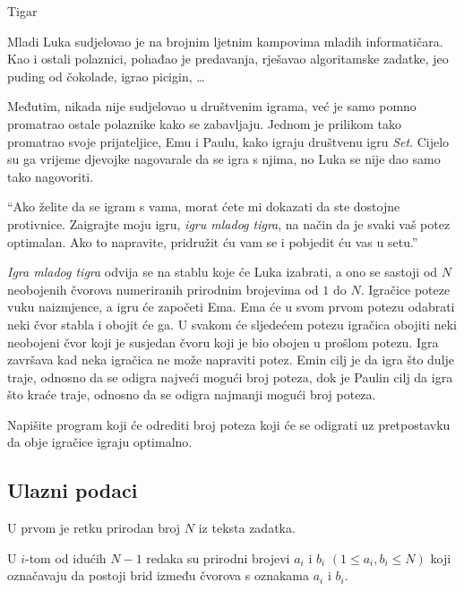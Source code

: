 \begin{statement}[
  problempoints=100,
  timelimit=3 sekunde,
  memorylimit=512 MiB,
]{Tigar}

Mladi Luka sudjelovao je na brojnim ljetnim kampovima mladih informatičara.
Kao i ostali polaznici, pohađao je predavanja, rješavao algoritamske zadatke,
jeo puding od čokolade, igrao picigin, \ldots

Međutim, nikada nije sudjelovao u društvenim igrama, već je samo pomno
promatrao ostale polaznike kako se zabavljaju. Jednom je prilikom tako
promatrao svoje prijateljice, Emu i Paulu, kako igraju društvenu igru
\textit{Set}. Cijelo su ga vrijeme djevojke nagovarale da se igra s njima,
no Luka se nije dao samo tako nagovoriti.

``Ako želite da se igram s vama, morat ćete mi dokazati da ste dostojne
  protivnice. Zaigrajte moju igru, \textit{igru mladog tigra}, na način da je
  svaki vaš potez optimalan. Ako to napravite, pridružit ću vam se i pobjedit ću
  vas u setu.''

\textit{Igra mladog tigra} odvija se na stablu koje će Luka izabrati, a ono se
sastoji od $N$ neobojenih čvorova numeriranih prirodnim brojevima od $1$ do
$N$. Igračice poteze vuku naizmjence, a igru će započeti Ema. Ema će u svom
prvom potezu odabrati neki čvor stabla i obojit će ga. U svakom će sljedećem
potezu igračica obojiti neki neobojeni čvor koji je susjedan čvoru koji je
bio obojen u prošlom potezu. Igra završava kad neka igračica ne može
napraviti potez. Emin cilj je da igra što dulje traje, odnosno da se odigra
najveći mogući broj poteza, dok je Paulin cilj da igra što kraće traje,
odnosno da se odigra najmanji mogući broj poteza.

Napišite program koji će odrediti broj poteza koji će se odigrati uz
pretpostavku da obje igračice igraju optimalno.

\subsection*{Ulazni podaci}

U prvom je retku prirodan broj $N$ iz teksta zadatka.

U $i$-tom od idućih $N - 1$ redaka su prirodni brojevi $a_i$ i $b_i$
$(1 \le a_i, b_i \le N)$ koji označavaju da postoji brid između čvorova
s oznakama $a_i$ i $b_i$.


\end{statement}
